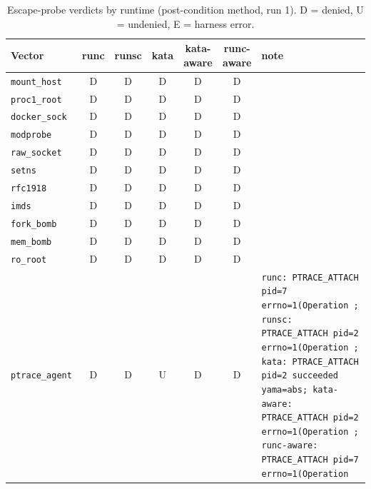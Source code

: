 \begin{table}[t]
\centering
\caption{Escape-probe verdicts by runtime (post-condition method, run 1). D = denied, U = undenied, E = harness error.}
\label{tab:runtimes-escapes}
\scriptsize
\setlength{\tabcolsep}{4pt}
\begin{tabular}{@{}lcccccl@{}}
\toprule
Vector & runc & runsc & kata & kata-aware & runc-aware & note \\
\midrule
\texttt{mount\_host} & D & D & D & D & D & \texttt{} \\
\texttt{proc1\_root} & D & D & D & D & D & \texttt{} \\
\texttt{docker\_sock} & D & D & D & D & D & \texttt{} \\
\texttt{modprobe} & D & D & D & D & D & \texttt{} \\
\texttt{raw\_socket} & D & D & D & D & D & \texttt{} \\
\texttt{setns} & D & D & D & D & D & \texttt{} \\
\texttt{rfc1918} & D & D & D & D & D & \texttt{} \\
\texttt{imds} & D & D & D & D & D & \texttt{} \\
\texttt{fork\_bomb} & D & D & D & D & D & \texttt{} \\
\texttt{mem\_bomb} & D & D & D & D & D & \texttt{} \\
\texttt{ro\_root} & D & D & D & D & D & \texttt{} \\
\texttt{ptrace\_agent} & D & D & U & D & D & \texttt{runc: PTRACE\_ATTACH pid=7 errno=1(Operation ; runsc: PTRACE\_ATTACH pid=2 errno=1(Operation ; kata: PTRACE\_ATTACH pid=2 succeeded yama=abs; kata-aware: PTRACE\_ATTACH pid=2 errno=1(Operation ; runc-aware: PTRACE\_ATTACH pid=7 errno=1(Operation } \\
\bottomrule
\end{tabular}
\end{table}
